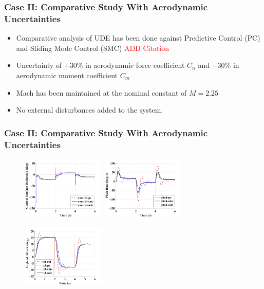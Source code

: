 \documentclass[table,10pt,red]{beamer}	%
\begin{document}
\begin{frame}
\frametitle{Case II: Comparative Study With Aerodynamic Uncertainties}
\begin{itemize}  %
		\item Comparative analysis of UDE has been done against Predictive Control (PC) and Sliding Mode Control (SMC) \textcolor{red}{ADD Citation}
		\item Uncertainty of $+30\%$ in aerodynamic force coefficient $C_n$ and $-30\%$ in aerodynamic moment coefficient $C_m$
		\item Mach has been maintained at the nominal constant of $M = 2.25$ 
		\item No external disturbances added to the system.
\end{itemize}
\end{frame}
%
\begin{frame} 
\frametitle{Case II: Comparative Study With Aerodynamic Uncertainties}
\begin{figure}
\includegraphics[width=4cm]{control_kcn_13_kcm_07}
\includegraphics[width=4cm]{pitch_kcn_13_kcm_07}
\begin{center}
\includegraphics[width=4cm]{x1_kcn_13_kcm_07}
\end{center}
\end{figure}
\end{frame}
\end{document}
